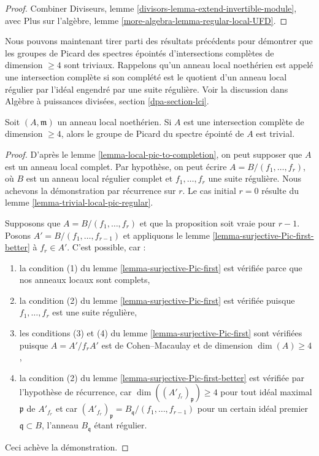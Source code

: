 \begin{proof}
Combiner Diviseurs, lemme \ref{divisors-lemma-extend-invertible-module},
avec Plus sur l'algèbre, lemme \ref{more-algebra-lemma-regular-local-UFD}.
\end{proof}

\noindent
Nous pouvons maintenant tirer parti des résultats précédents pour démontrer que
les groupes de Picard des spectres épointés
d'intersections complètes de dimension $\geq 4$ sont triviaux.
Rappelons qu'un anneau local noethérien est appelé une intersection
complète si son complété est le quotient d'un
anneau local régulier par l'idéal engendré par une suite régulière.
Voir la discussion dans Algèbre à puissances divisées, section \ref{dpa-section-lci}.

\begin{proposition}[Grothendieck]
\label{proposition-trivial-local-pic-complete-intersection}
Soit $(A, \mathfrak m)$ un anneau local noethérien. Si $A$ est une
intersection complète de dimension $\geq 4$, alors le groupe de Picard
du spectre épointé de $A$ est trivial.
\end{proposition}

\begin{proof}
D'après le lemme \ref{lemma-local-pic-to-completion}, on peut supposer que $A$ est
un anneau local complet. Par hypothèse, on peut écrire
$A = B/(f_1, \ldots, f_r)$, où $B$ est un anneau local régulier
complet et $f_1, \ldots, f_r$ une suite régulière.
Nous achevons la démonstration par récurrence sur $r$.
Le cas initial $r = 0$ résulte du
lemme \ref{lemma-trivial-local-pic-regular}.

\medskip\noindent
Supposons que $A = B/(f_1, \ldots, f_r)$ et que la proposition
soit vraie pour $r - 1$. Posons $A' = B/(f_1, \ldots, f_{r - 1})$ et appliquons le
lemme \ref{lemma-surjective-Pic-first-better} à $f_r \in A'$.
C'est possible, car :
\begin{enumerate}
\item la condition (1) du lemme \ref{lemma-surjective-Pic-first} est vérifiée
parce que nos anneaux locaux sont complets,
\item la condition (2) du lemme \ref{lemma-surjective-Pic-first} est vérifiée
puisque $f_1, \ldots, f_r$ est une suite régulière,
\item les conditions (3) et (4) du lemme \ref{lemma-surjective-Pic-first} sont vérifiées
puisque $A = A'/f_r A'$ est de Cohen--Macaulay et de dimension $\dim(A) \geq 4$,
\item la condition (2) du lemme \ref{lemma-surjective-Pic-first-better}
est vérifiée par l'hypothèse de récurrence, car
$\dim((A'_{f_r})_\mathfrak p) \geq 4$ pour tout idéal maximal
$\mathfrak p$ de $A'_{f_r}$ et car
$(A'_{f_r})_\mathfrak p = B_\mathfrak q/(f_1, \ldots, f_{r - 1})$
pour un certain idéal premier $\mathfrak q \subset B$, l'anneau $B_\mathfrak q$ étant régulier.
\end{enumerate}
Ceci achève la démonstration.
\end{proof}

